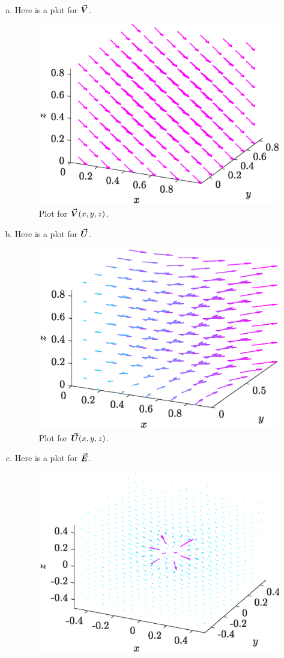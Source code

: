 \documentclass[12pt]{article} %
\begin{document}
\begin{solution}~
\begin{enumerate}[(a)]
    \item Here is a plot for $\boldsymbol{\vec{V}}$.
    \begin{figure}[H]
        \centering
        \includegraphics[width=.75\textwidth]{figures/4a}
        \caption{Plot for $\boldsymbol{\vec{V}}(x,y,z)$.}
    \end{figure}
    \newpage
    \item Here is a plot for $\boldsymbol{\vec{U}}$.
    \begin{figure}[H]
        \centering
        \includegraphics[width=.75\textwidth]{figures/4b}
        \caption{Plot for $\boldsymbol{\vec{U}}(x,y,z)$.}
    \end{figure}
    \item Here is a plot for $\boldsymbol{\vec{E}}$.
    \begin{figure}[H]
        \centering
        \includegraphics[width=.75\textwidth]{figures/4c}

\end{figure}
\end{enumerate}
\end{solution}
\end{document}
